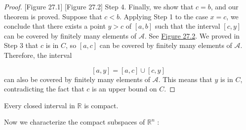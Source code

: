 \begin{proof}
[Figure 27.1]
[Figure 27.2]
Step 4. Finally, we show that \(c = b\), and our theorem is proved. Suppose that \(c < b\). Applying Step 1 to the case \(x = c\), we conclude that there exists a point \(y > c\) of \([ {a,b}]\) such that the interval \([ {c,y}]\) can be covered by finitely many elements of \(\mathcal{A}\). See \hyperref[fig:27.2]{Figure 27.2}. We proved in Step 3 that \(c\) is in \(C\), so \([ {a,c}]\) can be covered by finitely many elements of \(\mathcal{A}\). Therefore, the interval

\[
[ {a,y}] = [ {a,c}] \cup [ {c,y}]
\]
can also be covered by finitely many elements of \(\mathcal{A}\). This means that \(y\) is in \(C\), contradicting the fact that \(c\) is an upper bound on \(C\).
\end{proof}

\begin{corollary}
\label{cor:\thetheorem}
 Every closed interval in \(\mathbb{R}\) is compact.
\end{corollary}

Now we characterize the compact subspaces of \(\mathbb{R}^{n}\) :

